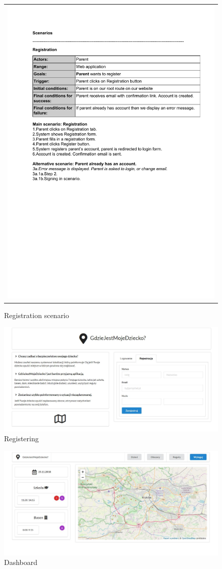 \documentclass{sprawozdanie-agh}
\begin{document}
		\begin{figure}[H] 
			\centering
			\begin{tabular}{c}
				\includegraphics[width=.80\textwidth]{reg_cropped} 
			\end{tabular} 
		\caption{Registration scenario}
		\end{figure}

		\begin{figure}[H]
			\centering
			\includegraphics[width=.80\textwidth]{register}
			\caption{Registering}
		\end{figure}

		\begin{figure}[H]
			\centering
			\includegraphics[width=.80\textwidth]{dashboard}
			\caption{Dashboard}
		\end{figure}
\end{document}
